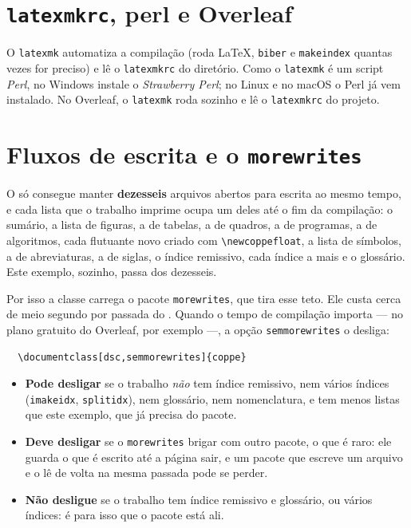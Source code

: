 \documentclass[dsc,pdfa]{coppe}
\begin{document}
  \section{\texttt{latexmkrc}, perl e Overleaf}
  O \verb|latexmk| automatiza a compilação (roda \LaTeX, \verb|biber| e \verb|makeindex| quantas vezes for preciso) e lê o \texttt{latexmkrc} do diretório. Como o \verb|latexmk| é um script \emph{Perl}, no Windows instale o \emph{Strawberry Perl}; no Linux e no macOS o Perl já vem instalado. No Overleaf, o \verb|latexmk| roda sozinho e lê o \texttt{latexmkrc} do projeto.

  \section{Fluxos de escrita e o \texttt{morewrites}}
  \label{sec:morewrites}

  O  só consegue manter \textbf{dezesseis} arquivos abertos para escrita ao mesmo tempo, e cada lista que o trabalho imprime ocupa um deles até o fim da compilação: o sumário, a lista de figuras, a de tabelas, a de quadros, a de programas, a de algoritmos, cada flutuante novo criado com \verb|\newcoppefloat|, a lista de símbolos, a de abreviaturas, a de siglas, o índice remissivo, cada índice a mais e o glossário. Este exemplo, sozinho, passa dos dezesseis.

  Por isso a classe carrega o pacote \verb|morewrites|, que tira esse teto. Ele custa cerca de meio segundo por passada do . Quando o tempo de compilação importa --- no plano gratuito do Overleaf, por exemplo ---, a opção \verb|semmorewrites| o desliga:
  \begin{verbatim}
  \documentclass[dsc,semmorewrites]{coppe}
  \end{verbatim}

  \begin{itemize}
    \item \textbf{Pode desligar} se o trabalho \emph{não} tem índice remissivo, nem vários índices (\verb|imakeidx|, \verb|splitidx|), nem glossário, nem nomenclatura, e tem menos listas que este exemplo, que já precisa do pacote.
    \item \textbf{Deve desligar} se o \verb|morewrites| brigar com outro pacote, o que é raro: ele guarda o que é escrito até a página sair, e um pacote que escreve um arquivo e o lê de volta na mesma passada pode se perder.
    \item \textbf{Não desligue} se o trabalho tem índice remissivo e glossário, ou vários índices: é para isso que o pacote está ali.
  \end{itemize}
\end{document}
